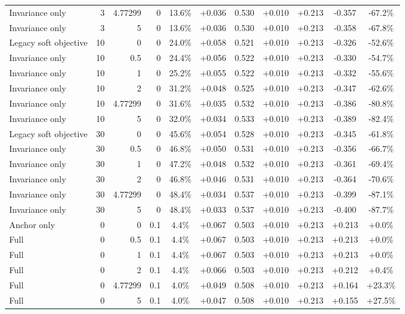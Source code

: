 \begin{table}[htbp]
\begin{tabular}{lrrrccccccc}
Invariance only & 3 & 4.77299 & 0 & 13.6\% & +0.036 & 0.530 & +0.010 & +0.213 & -0.357 & -67.2\% \\
Invariance only & 3 & 5 & 0 & 13.6\% & +0.036 & 0.530 & +0.010 & +0.213 & -0.358 & -67.8\% \\
Legacy soft objective & 10 & 0 & 0 & 24.0\% & +0.058 & 0.521 & +0.010 & +0.213 & -0.326 & -52.6\% \\
Invariance only & 10 & 0.5 & 0 & 24.4\% & +0.056 & 0.522 & +0.010 & +0.213 & -0.330 & -54.7\% \\
Invariance only & 10 & 1 & 0 & 25.2\% & +0.055 & 0.522 & +0.010 & +0.213 & -0.332 & -55.6\% \\
Invariance only & 10 & 2 & 0 & 31.2\% & +0.048 & 0.525 & +0.010 & +0.213 & -0.347 & -62.6\% \\
Invariance only & 10 & 4.77299 & 0 & 31.6\% & +0.035 & 0.532 & +0.010 & +0.213 & -0.386 & -80.8\% \\
Invariance only & 10 & 5 & 0 & 32.0\% & +0.034 & 0.533 & +0.010 & +0.213 & -0.389 & -82.4\% \\
Legacy soft objective & 30 & 0 & 0 & 45.6\% & +0.054 & 0.528 & +0.010 & +0.213 & -0.345 & -61.8\% \\
Invariance only & 30 & 0.5 & 0 & 46.8\% & +0.050 & 0.531 & +0.010 & +0.213 & -0.356 & -66.7\% \\
Invariance only & 30 & 1 & 0 & 47.2\% & +0.048 & 0.532 & +0.010 & +0.213 & -0.361 & -69.4\% \\
Invariance only & 30 & 2 & 0 & 46.8\% & +0.046 & 0.531 & +0.010 & +0.213 & -0.364 & -70.6\% \\
Invariance only & 30 & 4.77299 & 0 & 48.4\% & +0.034 & 0.537 & +0.010 & +0.213 & -0.399 & -87.1\% \\
Invariance only & 30 & 5 & 0 & 48.4\% & +0.033 & 0.537 & +0.010 & +0.213 & -0.400 & -87.7\% \\
Anchor only & 0 & 0 & 0.1 & 4.4\% & +0.067 & 0.503 & +0.010 & +0.213 & +0.213 & +0.0\% \\
Full & 0 & 0.5 & 0.1 & 4.4\% & +0.067 & 0.503 & +0.010 & +0.213 & +0.213 & +0.0\% \\
Full & 0 & 1 & 0.1 & 4.4\% & +0.067 & 0.503 & +0.010 & +0.213 & +0.213 & +0.0\% \\
Full & 0 & 2 & 0.1 & 4.4\% & +0.066 & 0.503 & +0.010 & +0.213 & +0.212 & +0.4\% \\
Full & 0 & 4.77299 & 0.1 & 4.0\% & +0.049 & 0.508 & +0.010 & +0.213 & +0.164 & +23.3\% \\
Full & 0 & 5 & 0.1 & 4.0\% & +0.047 & 0.508 & +0.010 & +0.213 & +0.155 & +27.5\% \\

\end{tabular}
\end{table}
